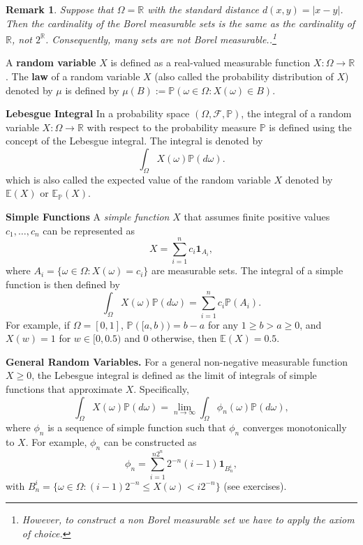\documentclass[letter,11pt]{article}
\newtheorem{remark}{Remark}[section]
\begin{document}
\begin{remark}
    Suppose that $\Omega = \mathbb{R}$ with the standard distance $d(x,y) = |x-y|$. Then the cardinality of the Borel measurable sets is the same as the cardinality of $\mathbb{R}$, not $2^{\mathbb{R}}$. Consequently, many sets are not Borel measurable..\footnote{However, to construct a non Borel measurable set we have to apply the axiom of choice. }  
\end{remark}

A \textbf{random variable} $X$ is defined as a real-valued measurable function $X: \Omega \rightarrow \mathbb{R}$. The \textbf{law} of a random variable $X$ (also called the probability distribution of $X$) denoted by $\mu$ is defined by $ \mu (B) := \mathbb{P} (\omega \in \Omega: X(\omega) \in B)$.




\textbf{Lebesgue Integral} In a probability space $(\Omega, \mathcal{F}, \mathbb{P})$, the integral of a random variable $X: \Omega \rightarrow \mathbb{R}$ with respect to the probability measure $\mathbb{P}$ is defined using the concept of the Lebesgue integral. The integral is denoted by
\[
\int_{\Omega} X(\omega) \mathbb{P}(d\omega).
\]
which is also called the expected value of the random variable $X$ denoted by $\mathbb{E}(X)$ or $\mathbb{E}_{\mathbb{P}}(X)$. 

\textbf{Simple Functions}
A \textit{simple function} $X$ that assumes finite positive values $c_1, \ldots, c_n$ can be represented as
\[
X = \sum_{i=1}^n c_i \mathbf{1}_{A_i},
\]
where $A_i = \{\omega \in \Omega : X(\omega) = c_i\}$ are measurable sets. The integral of a simple function is then defined by
\[
\int_{\Omega} X(\omega) \mathbb{P}(d\omega) = \sum_{i=1}^n c_i \mathbb{P}(A_i).
\]
For example, if $\Omega = [0,1]$, $\mathbb{P}([a,b) ) = b-a$ for any $1 \geq b>a \geq 0$, and $X (w)= 1$ for $w \in [0,0.5)$ and $0$ otherwise, then $\mathbb{E}(X) = 0.5$. 



\textbf{General Random Variables.} For a general non-negative measurable function $X \geq 0$, the Lebesgue integral is defined as the limit of integrals of simple functions that approximate $X$. Specifically,
\[
\int_{\Omega} X(\omega) \mathbb{P}(d\omega) = \lim_{n \rightarrow \infty} \int_{\Omega} \phi_n(\omega) \mathbb{P}(d\omega),
\]
where $\phi_n$ is a sequence of simple function such that $\phi_{n}$ converges monotonically to $X$. For example, $\phi_n$ can be constructed as
\[
\phi_n = \sum_{i=1}^{n 2^n} 2^{-n}(i-1) \mathbf{1}_{B_n^i},
\]
with $B_n^i = \{\omega \in \Omega : (i-1)2^{-n} \leq X(\omega) < i2^{-n}\}$ (see exercises).
\end{document}

